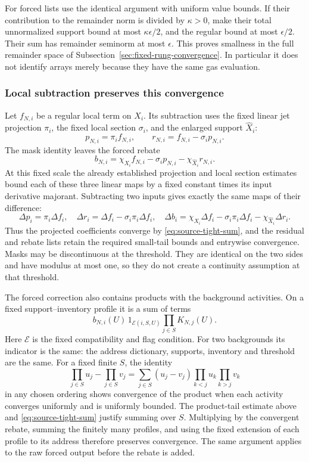 For forced lists use the identical argument with uniform value
bounds. If their contribution to the remainder norm is divided
by $\kappa>0$, make their total unnormalized support bound at
most $\kappa\epsilon/2$, and the regular bound at most
$\epsilon/2$. Their sum has remainder seminorm at most
$\epsilon$. This proves smallness in the full remainder space
of Subsection~\ref{sec:fixed-rung-convergence}. In particular it
does not identify arrays merely because they have the same gas
evaluation.

\subsubsection{Local subtraction preserves this convergence}
Let $f_{N,i}$ be a regular local term on $X_i$. Its subtraction
uses the fixed linear jet projection $\pi_i$, the fixed local
section $\sigma_i$, and the enlarged support $\widehat X_i$:
\[
 p_{N,i}=\pi_i f_{N,i},\qquad
 r_{N,i}=f_{N,i}-\sigma_i p_{N,i}.
\]
The mask identity leaves the forced rebate
\[
 b_{N,i}
   =\chi_{X_i}f_{N,i}-\sigma_i p_{N,i}
                                  -\chi_{\widehat X_i}r_{N,i}.
\]
At this fixed scale the already established projection and local
section estimates bound each of these three linear maps by a
fixed constant times its input derivative majorant. Subtracting
two inputs gives exactly the same maps of their difference:
\[
 \Delta p_i=\pi_i\Delta f_i,\quad
 \Delta r_i=\Delta f_i-\sigma_i\pi_i\Delta f_i,\quad
 \Delta b_i=\chi_{X_i}\Delta f_i-\sigma_i\pi_i\Delta f_i
                   -\chi_{\widehat X_i}\Delta r_i.
\]
Thus the projected coefficients converge by
\eqref{eq:source-tight-sum}, and the residual and rebate lists
retain the required small-tail bounds and entrywise convergence.
Masks may be discontinuous at the threshold. They are identical
on the two sides and have modulus at most one, so they do not
create a continuity assumption at that threshold.

The forced correction also contains products with the background
activities. On a fixed support--inventory profile it is a sum of
terms
\[
 b_{N,i}(U)\,1_{\mathcal E(i,S,U)}
                            \prod_{j\in S}K_{N,j}(U).
\]
Here $\mathcal E$ is the fixed compatibility and flag condition.
For two backgrounds its indicator is the same: the address
dictionary, supports, inventory and threshold are the same.
For a fixed finite $S$, the identity
\[
 \prod_{j\in S}u_j-\prod_{j\in S}v_j
   =\sum_{j\in S}(u_j-v_j)
          \prod_{k<j}u_k\prod_{k>j}v_k
\]
in any chosen ordering shows convergence of the product when
each activity converges uniformly and is uniformly bounded.
The product-tail estimate above and
\eqref{eq:source-tight-sum} justify summing over $S$. Multiplying
by the convergent rebate, summing the finitely many profiles,
and using the fixed extension of each profile to its address
therefore preserves convergence. The same argument applies to
the raw forced output before the rebate is added.

